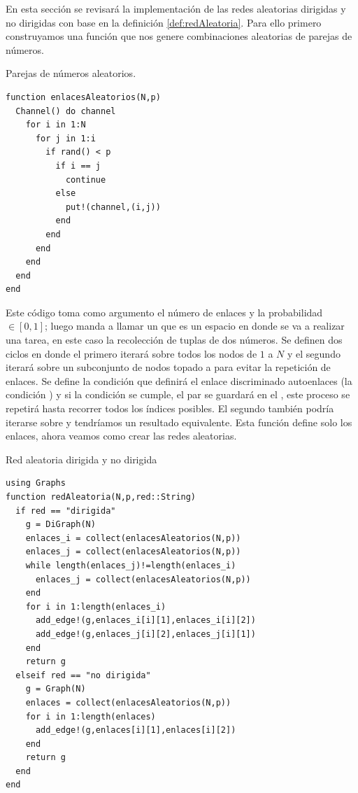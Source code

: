 En esta sección se revisará la implementación de las redes aleatorias dirigidas y no dirigidas con base en la definición \ref{def:redAleatoria}. Para ello primero construyamos una función que nos genere combinaciones aleatorias de parejas de números.
\begin{algorithm}
	\caption{Parejas de números aleatorios.}
	\label{al:enlacesAleatorios}
	\begin{verbatim}
function enlacesAleatorios(N,p)
  Channel() do channel
    for i in 1:N
      for j in 1:i
        if rand() < p
          if i == j
            continue
          else
            put!(channel,(i,j))
          end
        end
      end
    end
  end
end
	\end{verbatim}
\end{algorithm}

Este código toma como argumento el número de enlaces  y la probabilidad $\in[0,1]$; luego manda a llamar un  que es un espacio en donde se va a realizar una tarea, en este caso la recolección de tuplas de dos números. Se definen dos ciclos  en donde el primero iterará sobre todos los nodos de $1$ a $N$ y el segundo iterará sobre un subconjunto de nodos topado a  para evitar la repetición de enlaces. Se define la condición  que definirá el enlace discriminado autoenlaces (la condición ) y si la condición se cumple, el par  se guardará en el , este proceso se repetirá hasta recorrer todos los índices posibles. El segundo  también podría iterarse sobre  y tendríamos un resultado equivalente. Esta función define solo los enlaces, ahora veamos como crear las redes aleatorias.
\begin{algorithm}
	\caption{Red aleatoria dirigida y no dirigida}
	\label{al:redAleatoria}
	\begin{verbatim}
using Graphs
function redAleatoria(N,p,red::String)
  if red == "dirigida"
    g = DiGraph(N)
    enlaces_i = collect(enlacesAleatorios(N,p))
    enlaces_j = collect(enlacesAleatorios(N,p))
    while length(enlaces_j)!=length(enlaces_i)
      enlaces_j = collect(enlacesAleatorios(N,p))
    end   
    for i in 1:length(enlaces_i)
      add_edge!(g,enlaces_i[i][1],enlaces_i[i][2])
      add_edge!(g,enlaces_j[i][2],enlaces_j[i][1])
    end
    return g
  elseif red == "no dirigida"
    g = Graph(N)
    enlaces = collect(enlacesAleatorios(N,p))
    for i in 1:length(enlaces)
      add_edge!(g,enlaces[i][1],enlaces[i][2])
    end
    return g
  end
end
	\end{verbatim}
\end{algorithm}

